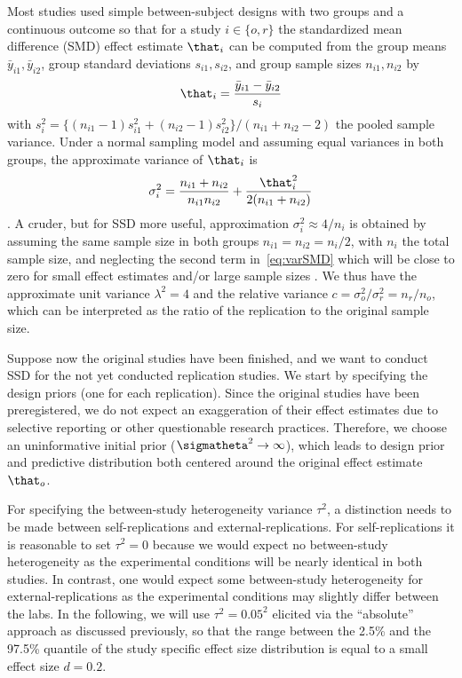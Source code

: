 Most studies used simple between-subject designs with two groups and a
continuous outcome so that for a study $i \in \{o, r\}$ the standardized mean
difference (SMD) effect estimate $\that_{i}$ can be computed from the group
means $\bar{y}_{i1}, \bar{y}_{i2}$, group standard deviations $s_{i1}, s_{i2}$,
and group sample sizes $n_{i1}, n_{i2}$ by
\begin{align*}
  \that_{i} = \frac{\bar{y}_{i1} - \bar{y}_{i2}}{s_{i}}
\end{align*}
with
$s^{2}_{i} = \{(n_{i1} - 1)s_{i1}^{2} + (n_{i2} - 1)s_{i2}^{2}\}/(n_{i1} + n_{i2} - 2)$
the pooled sample variance. Under a normal sampling model and assuming equal
variances in both groups, the approximate variance of $\that_{i}$ is
\begin{align}
  \sigma^{2}_{i} = \frac{n_{i1} + n_{i2}}{n_{i1}n_{i2}} + \frac{\that_{i}^{2}}{2(n_{i1} + n_{i2})}
  \label{eq:varSMD}
\end{align}
\citep{Hedges1981}. A cruder, but for SSD more useful, approximation
$\sigma^{2}_{i} \approx 4/n_{i}$ is obtained by assuming the same sample size in
both groups $n_{i1} = n_{i2} = n_{i}/2$, with $n_{i}$ the total sample size, and
neglecting the second term in~\eqref{eq:varSMD} which will be close to zero for
small effect estimates and/or large sample sizes \citep{Hedges2021}. We thus
have the approximate unit variance $\lambda^{2} = 4$ and the relative variance
$c = \sigma^{2}_{o}/\sigma^{2}_{r} = n_{r}/n_{o}$,
which can be interpreted as the ratio of the replication to the original sample
size.


Suppose now the original studies have been finished, and we want to conduct SSD
for the not yet conducted replication studies. We start by specifying the design
priors (one for each replication). Since the original studies have been
preregistered, we do not expect an exaggeration of their effect estimates due to
selective reporting or other questionable research practices. Therefore, we
choose an uninformative initial prior ($\sigmatheta^{2} \to \infty$), which
leads to design prior and predictive distribution both centered around the
original effect estimate $\that_{o}$.

For specifying the between-study heterogeneity variance $\tau^{2}$, a
distinction needs to be made between self-replications and
external-replications. For self-replications it is reasonable to set
$\tau^{2} = 0$ because we would expect no between-study heterogeneity as the
experimental conditions will be nearly identical in both studies. In contrast,
one would expect some between-study heterogeneity for external-replications as
the experimental conditions may slightly differ between the labs. In the
following, we will use $\tau^{2} = 0.05^{2}$ elicited via
the ``absolute'' approach as discussed previously,
so that the range between the 2.5\% and the 97.5\% quantile of the study
specific effect size distribution is equal to a small effect size $d = 0.2$.

